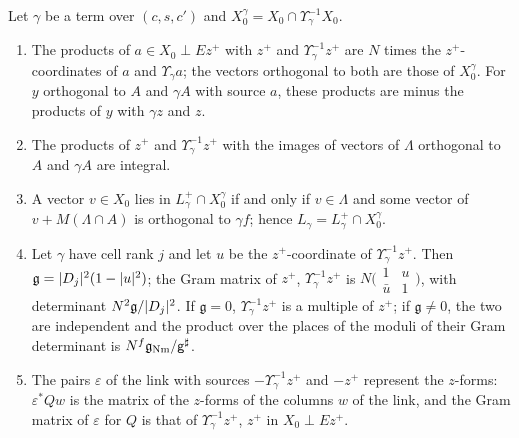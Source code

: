 \begin{lemma}\label{lem:link-vectors}
Let $\gamma$ be a term over $(c,s,c')$ and $X_0^\gamma=X_0\cap\Upsilon_\gamma^{-1}X_0$.
\begin{enumerate}[label=\textup{(\alph*)}]
\item The products of $a\in X_0\perp Ez^+$ with $z^+$ and $\Upsilon_\gamma^{-1}z^+$ are $N$ times the $z^+$-coordinates of $a$ and $\Upsilon_\gamma a$; the vectors orthogonal to both are those of $X_0^\gamma$. For $y$ orthogonal to $A$ and $\gamma A$
with source $a$, these products are minus the products of $y$ with $\gamma z$ and $z$.
\item The products of $z^+$ and $\Upsilon_\gamma^{-1}z^+$ with the images of vectors of $\Lambda$ orthogonal to $A$ and $\gamma A$ are integral.
\item A vector $v\in X_0$ lies in $L^+_\gamma\cap X_0^\gamma$ if and only if $v\in\Lambda$ and some vector of $v+M(\Lambda\cap A)$ is orthogonal to $\gamma f$; hence $L_\gamma=L^+_\gamma\cap X_0^\gamma$.
\item Let $\gamma$ have cell rank $j$ and let $u$ be the $z^+$-coordinate of $\Upsilon_\gamma^{-1}z^+$. Then $\mathfrak g=\lvert D_j\rvert^2(1-\lvert u\rvert^2)$; the Gram matrix of $z^+$, $\Upsilon_\gamma^{-1}z^+$ is $N\bigl(\begin{smallmatrix}1&u\\\bar u&1\end{smallmatrix}\bigr)$, with
determinant $N^2\mathfrak g/\lvert D_j\rvert^2$. If $\mathfrak g=0$, $\Upsilon_\gamma^{-1}z^+$ is a multiple of $z^+$; if $\mathfrak g\ne0$, the two are independent and the product over the places of the moduli of their Gram
determinant is $N^f\mathfrak g_{\rm Nm}/\mathsf g^\sharp$.
\item The pairs $\varepsilon$ of the link with sources $-\Upsilon_\gamma^{-1}z^+$ and $-z^+$ represent the $z$-forms: $\varepsilon^*Qw$ is the matrix of the $z$-forms of the columns $w$ of the link, and the Gram matrix of $\varepsilon$ for
$Q$ is that of $\Upsilon_\gamma^{-1}z^+$, $z^+$ in $X_0\perp Ez^+$.
\end{enumerate}
\end{lemma}

